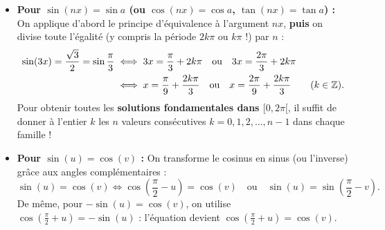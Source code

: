 \begin{itemize}
    \item \textbf{Pour $\sin(nx) = \sin a$ (ou $\cos(nx) = \cos a$, $\tan(nx) = \tan a$) :} On applique d'abord le principe d'équivalence à l'argument $nx$, \textbf{puis} on divise toute l'égalité (y compris la période $2k\pi$ ou $k\pi$ !) par $n$ :
    \begin{align*}
        \sin(3x) = \frac{\sqrt{3}}{2} = \sin\frac{\pi}{3} &\iff 3x = \frac{\pi}{3} + 2k\pi \quad \text{ou} \quad 3x = \frac{2\pi}{3} + 2k\pi \\
        &\iff x = \frac{\pi}{9} + \frac{2k\pi}{3} \quad \text{ou} \quad x = \frac{2\pi}{9} + \frac{2k\pi}{3} \qquad (k\in\mathbb{Z}).
    \end{align*}
    Pour obtenir toutes les \textbf{solutions fondamentales dans $[0, 2\pi[$}, il suffit de donner à l'entier $k$ les $n$ valeurs consécutives $k = 0, 1, 2, \dots, n-1$ dans chaque famille !
    \item \textbf{Pour $\sin(u) = \cos(v)$ :} On transforme le cosinus en sinus (ou l'inverse) grâce aux angles complémentaires :
    \[
        \boxed{\sin(u) = \cos(v) \iff \cos\left(\frac{\pi}{2} - u\right) = \cos(v) \quad \text{ou} \quad \sin(u) = \sin\left(\frac{\pi}{2} - v\right)}.
    \]
    De même, pour $-\sin(u) = \cos(v)$, on utilise $\cos\left(\frac{\pi}{2} + u\right) = -\sin(u)$ : l'équation devient $\cos\left(\frac{\pi}{2} + u\right) = \cos(v)$.
\end{itemize}

